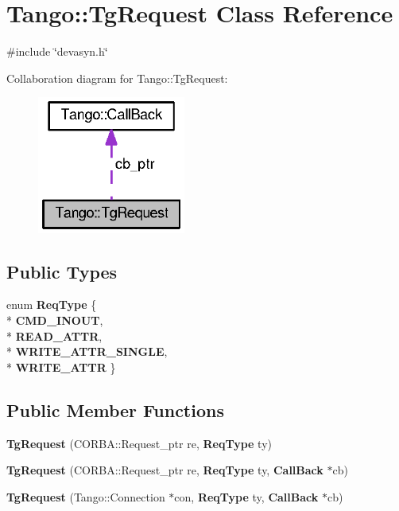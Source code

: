 \section{Tango\-:\-:Tg\-Request Class Reference}
\label{classTango_1_1TgRequest}


{\ttfamily \#include \char`\"{}devasyn.\-h\char`\"{}}



Collaboration diagram for Tango\-:\-:Tg\-Request\-:
\nopagebreak
\begin{figure}[H]
\begin{center}
\leavevmode
\includegraphics[width=138pt]{d6/d3f/classTango_1_1TgRequest__coll__graph}
\end{center}
\end{figure}
\subsection*{Public Types}
\begin{DoxyCompactItemize}
\item 
enum {\bf Req\-Type} \{ \\*
{\bf C\-M\-D\-\_\-\-I\-N\-O\-U\-T}, 
\\*
{\bf R\-E\-A\-D\-\_\-\-A\-T\-T\-R}, 
\\*
{\bf W\-R\-I\-T\-E\-\_\-\-A\-T\-T\-R\-\_\-\-S\-I\-N\-G\-L\-E}, 
\\*
{\bf W\-R\-I\-T\-E\-\_\-\-A\-T\-T\-R}
 \}
\end{DoxyCompactItemize}
\subsection*{Public Member Functions}
\begin{DoxyCompactItemize}
\item 
{\bf Tg\-Request} (C\-O\-R\-B\-A\-::\-Request\-\_\-ptr re, {\bf Req\-Type} ty)
\item 
{\bf Tg\-Request} (C\-O\-R\-B\-A\-::\-Request\-\_\-ptr re, {\bf Req\-Type} ty, {\bf Call\-Back} $\ast$cb)
\item 
{\bf Tg\-Request} (Tango\-::\-Connection $\ast$con, {\bf Req\-Type} ty, {\bf Call\-Back} $\ast$cb)
\end{DoxyCompactItemize}
